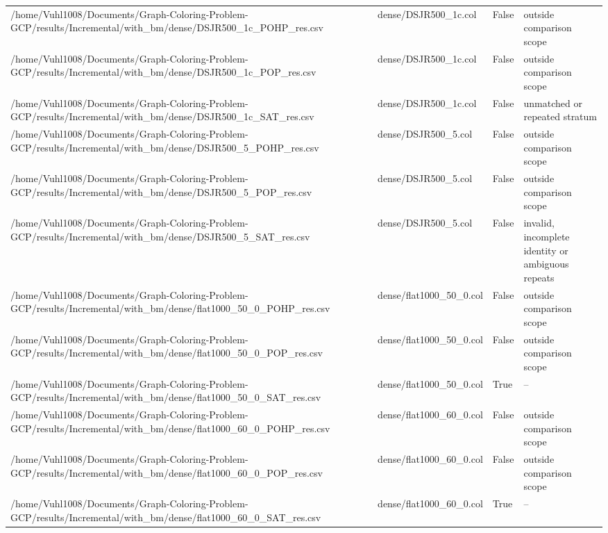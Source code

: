 \begin{table}[htbp]
\begin{tabular}{llll}
/home/Vuhl1008/Documents/Graph-Coloring-Problem-GCP/results/Incremental/with\_bm/dense/DSJR500\_1c\_POHP\_res.csv & dense/DSJR500\_1c.col & False & outside comparison scope \\
/home/Vuhl1008/Documents/Graph-Coloring-Problem-GCP/results/Incremental/with\_bm/dense/DSJR500\_1c\_POP\_res.csv & dense/DSJR500\_1c.col & False & outside comparison scope \\
/home/Vuhl1008/Documents/Graph-Coloring-Problem-GCP/results/Incremental/with\_bm/dense/DSJR500\_1c\_SAT\_res.csv & dense/DSJR500\_1c.col & False & unmatched or repeated stratum \\
/home/Vuhl1008/Documents/Graph-Coloring-Problem-GCP/results/Incremental/with\_bm/dense/DSJR500\_5\_POHP\_res.csv & dense/DSJR500\_5.col & False & outside comparison scope \\
/home/Vuhl1008/Documents/Graph-Coloring-Problem-GCP/results/Incremental/with\_bm/dense/DSJR500\_5\_POP\_res.csv & dense/DSJR500\_5.col & False & outside comparison scope \\
/home/Vuhl1008/Documents/Graph-Coloring-Problem-GCP/results/Incremental/with\_bm/dense/DSJR500\_5\_SAT\_res.csv & dense/DSJR500\_5.col & False & invalid, incomplete identity or ambiguous repeats \\
/home/Vuhl1008/Documents/Graph-Coloring-Problem-GCP/results/Incremental/with\_bm/dense/flat1000\_50\_0\_POHP\_res.csv & dense/flat1000\_50\_0.col & False & outside comparison scope \\
/home/Vuhl1008/Documents/Graph-Coloring-Problem-GCP/results/Incremental/with\_bm/dense/flat1000\_50\_0\_POP\_res.csv & dense/flat1000\_50\_0.col & False & outside comparison scope \\
/home/Vuhl1008/Documents/Graph-Coloring-Problem-GCP/results/Incremental/with\_bm/dense/flat1000\_50\_0\_SAT\_res.csv & dense/flat1000\_50\_0.col & True & -- \\
/home/Vuhl1008/Documents/Graph-Coloring-Problem-GCP/results/Incremental/with\_bm/dense/flat1000\_60\_0\_POHP\_res.csv & dense/flat1000\_60\_0.col & False & outside comparison scope \\
/home/Vuhl1008/Documents/Graph-Coloring-Problem-GCP/results/Incremental/with\_bm/dense/flat1000\_60\_0\_POP\_res.csv & dense/flat1000\_60\_0.col & False & outside comparison scope \\
/home/Vuhl1008/Documents/Graph-Coloring-Problem-GCP/results/Incremental/with\_bm/dense/flat1000\_60\_0\_SAT\_res.csv & dense/flat1000\_60\_0.col & True & -- \\

\end{tabular}
\end{table}
